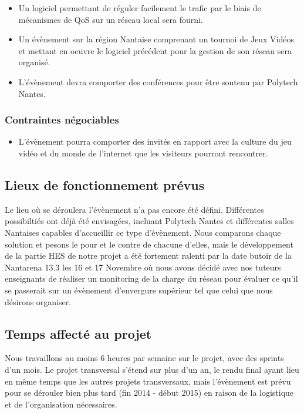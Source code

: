 \documentclass[french]{article}
\begin{document}
\begin{itemize}
	\item Un logiciel permettant de réguler facilement le trafic par le biais de mécanismes de QoS sur un réseau local sera fourni.
	\item Un évènement sur la région Nantaise comprenant un tournoi de Jeux Vidéos et mettant en oeuvre le logiciel précédent pour la gestion de son réseau sera organisé.
	\item L'évènement devra comporter des conférences pour être soutenu par Polytech Nantes.
\end{itemize}

\subsubsection{Contraintes négociables}

\begin{itemize}
	\item L'évènement pourra comporter des invités en rapport avec la culture du jeu vidéo et du monde de l'internet que les visiteurs pourront rencontrer.
\end{itemize}

\subsection{Lieux de fonctionnement prévus}

Le lieu où se déroulera l'évènement n'a pas encore été défini. Différentes possibiltiés ont déjà été envisagées, incluant Polytech Nantes et différentes salles Nantaises capables d'accueillir ce type d'évènement. Nous comparons chaque solution et pesons le pour et le contre de chacune d'elles, mais le développement de la partie HES de notre projet a été fortement ralenti par la date butoir de la Nantarena 13.3 les 16 et 17 Novembre où nous avons décidé avec nos tuteurs enseignants de réaliser un monitoring de la charge du réseau pour évaluer ce qu'il se passerait sur un évènement d'envergure supérieur tel que celui que nous désirons organiser.

\subsection{Temps affecté au projet}

Nous travaillons au moins 6 heures par semaine sur le projet, avec des sprints d'un mois.
Le projet transversal s'étend sur plus d'un an, le rendu final ayant lieu en même temps que les autres projets transversaux, mais l'évènement est prévu pour se dérouler bien plus tard (fin 2014 - début 2015) en raison de la logistique et de l'organisation nécessaires.
\end{document}
